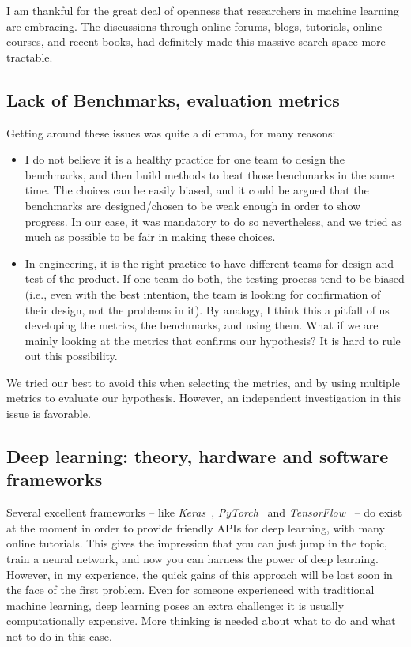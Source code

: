     \par I am thankful for the great deal of openness that researchers in machine learning are embracing. The discussions through online forums, blogs, tutorials, online courses, and recent books, had definitely made this massive search space more tractable.

  \subsection{Lack of Benchmarks, evaluation metrics}
    Getting around these issues was quite a dilemma, for many reasons:

      \begin{itemize}
        \item I do not believe it is a healthy practice for one team to design the benchmarks, and then build methods to beat those benchmarks in the same time. The choices can be easily biased, and it could be argued that the benchmarks are designed/chosen to be weak enough in order to show progress. In our case, it was mandatory to do so nevertheless, and we tried as much as possible to be fair in making these choices.
        \item In engineering, it is the right practice to have different teams for design and test of the product. If one team do both, the testing process tend to be biased (i.e., even with the best intention, the team is looking for confirmation of their design, not the problems in it). By analogy, I think this a pitfall of us developing the metrics, the benchmarks, and using them. What if we are mainly looking at the metrics that confirms our hypothesis? It is hard to rule out this possibility.
      \end{itemize}

    We tried our best to avoid this when selecting the metrics, and by using multiple metrics to evaluate our hypothesis. However, an independent investigation in this issue is favorable.

  \subsection{Deep learning: theory, hardware and software frameworks}
    \par Several excellent frameworks -- like \textit{Keras}~\citep{chollet2015keras}, \textit{PyTorch}~\citep{paszke2017automatic} and \textit{TensorFlow}~\citep{tensorflow2015-whitepaper} -- do exist at the moment in order to provide friendly APIs for deep learning, with many online tutorials. This gives the impression that you can just jump in the topic, train a neural network, and now you can harness the power of deep learning. However, in my experience, the quick gains of this approach will be lost soon in the face of the first problem. Even for someone experienced with traditional machine learning, deep learning poses an extra challenge: it is usually computationally expensive. More thinking is needed about what to do and what not to do in this case.

